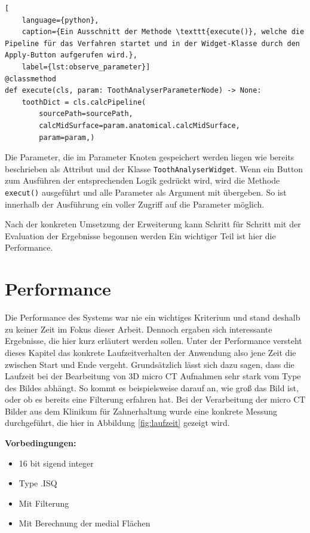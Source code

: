 \begin{lstlisting}[
    language={python},
    caption={Ein Ausschnitt der Methode \texttt{execute()}, welche die Pipeline für das Verfahren startet und in der Widget-Klasse durch den Apply-Button aufgerufen wird.},
    label={lst:observe_parameter}]
@classmethod
def execute(cls, param: ToothAnalyserParameterNode) -> None:
    toothDict = cls.calcPipeline(
	    sourcePath=sourcePath,
	    calcMidSurface=param.anatomical.calcMidSurface,
	    param=param,)
\end{lstlisting}

Die Parameter, die im Parameter Knoten gespeichert werden liegen wie bereits beschrieben
als Attribut und der Klasse \texttt{ToothAnalyserWidget}. Wenn ein Button zum Ausführen
der entsprechenden Logik gedrückt wird, wird die Methode \texttt{execut()} ausgeführt
und alle Parameter als Argument mit übergeben. So ist innerhalb der Ausführung
ein voller Zugriff auf die Parameter möglich.

Nach der konkreten Umsetzung der Erweiterung kann Schritt für Schritt mit der
Evaluation der Ergebnisse begonnen werden Ein wichtiger Teil ist hier die
Performance.

\section{Performance}
Die Performance des Systems war nie ein wichtiges Kriterium und stand deshalb zu
keiner Zeit im Fokus dieser Arbeit. Dennoch ergaben sich interessante Ergebnisse,
die hier kurz erläutert werden sollen. Unter der Performance versteht dieses Kapitel
das konkrete Laufzeitverhalten der Anwendung also jene Zeit die zwischen Start und
Ende vergeht. Grundsätzlich lässt sich dazu sagen, dass die Laufzeit bei der Bearbeitung
von 3D micro CT Aufnahmen sehr stark vom Type des Bildes abhängt. So kommt es
beispielsweise darauf an, wie groß das Bild ist, oder ob es bereits eine
Filterung erfahren hat. Bei der Verarbeitung der micro CT Bilder aus dem Klinikum
für Zahnerhaltung wurde eine konkrete Messung durchgeführt, die hier in
Abbildung \ref{fig:laufzeit} gezeigt wird.

\textbf{Vorbedingungen:}
\begin{itemize}
	\item 16 bit sigend integer

	\item Type .ISQ

	\item Mit Filterung

	\item Mit Berechnung der medial Flächen
\end{itemize}

